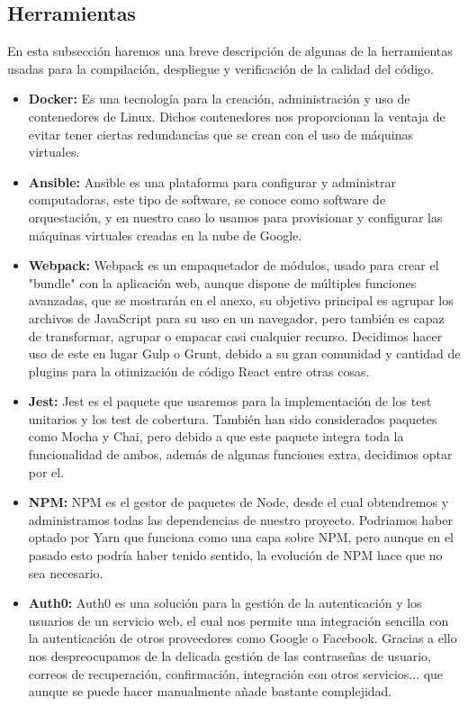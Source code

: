 \subsection {Herramientas}
En esta subsección haremos una breve descripción de algunas de la herramientas usadas para la compilación, despliegue y verificación de la calidad del código.

\begin{itemize}
  \item \textbf{Docker:} Es una tecnología para la creación, administración y uso de contenedores de Linux. Dichos contenedores nos proporcionan la ventaja de evitar tener ciertas redundancias que se crean con el uso de máquinas virtuales.
  
  \item \textbf{Ansible:} Ansible es una plataforma para configurar y administrar computadoras, este tipo de software, se conoce como software de orquestación, y en nuestro caso lo usamos para provisionar y configurar las máquinas virtuales creadas en la nube de Google.
  
  \item \textbf{Webpack:} Webpack es un empaquetador de módulos, usado para crear el "bundle" con la aplicación web, aunque dispone de múltiples funciones avanzadas, que se mostrarán en el anexo, su objetivo principal es agrupar los archivos de JavaScript para su uso en un navegador, pero también es capaz de transformar, agrupar o empacar casi cualquier recurso. Decidimos hacer uso de este en lugar Gulp o Grunt, debido a su gran comunidad y cantidad de plugins para la otimización de código React entre otras cosas.

  \item \textbf{Jest:} Jest es el paquete que usaremos para la implementación de los test unitarios y los test de cobertura. También han sido considerados paquetes como Mocha y Chai, pero debido a que este paquete integra toda la funcionalidad de ambos, además de algunas funciones extra, decidimos optar por el.
  
  \item \textbf{NPM:} NPM es el gestor de paquetes de Node, desde el cual obtendremos y administramos todas las dependencias de nuestro proyecto. Podriamos haber optado por Yarn que funciona como una capa sobre NPM, pero aunque en el pasado esto podría haber tenido sentido, la evolución de NPM hace que no sea necesario.
  
  \item \textbf{Auth0:} Auth0 es una solución para la gestión de la autenticación y los usuarios de un servicio web, el cual nos permite una integración sencilla con la autenticación de otros proveedores como Google o Facebook.  Gracias a ello nos despreocupamos de la delicada gestión de las contraseñas de usuario, correos de recuperación, confirmación, integración con otros servicios... que aunque se puede hacer manualmente añade bastante complejidad.
  

\end{itemize}
